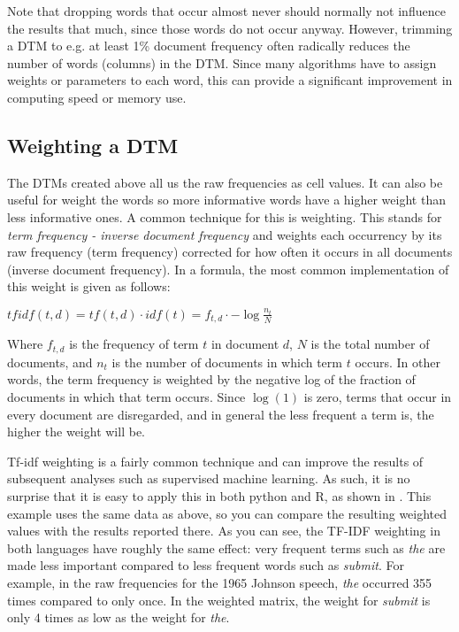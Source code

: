 Note that dropping words that occur almost never should normally not influence the results that much, since those words do not occur anyway.
However, trimming a DTM to e.g. at least 1\% document frequency often radically reduces the number of words (columns) in the DTM.
Since many algorithms have to assign weights or parameters to each word, this can provide a significant improvement in computing speed or memory use. 

\subsection{Weighting a DTM}

The DTMs created above all us the raw frequencies as cell values.
It can also be useful for weight the words so more informative words have a higher weight than less informative ones.
A common technique for this is  weighting.
This stands for \emph{term frequency - inverse document frequency} and weights each occurrency by its raw frequency (term frequency) corrected for how often it occurs in all documents (inverse document frequency). In a formula, the most common implementation of this weight is given as follows:

$tfidf(t,d)=tf(t,d)\cdot idf(t)=f_{t,d}\cdot -\log \frac{n_t}{N}$

Where $f_{t,d}$ is the frequency of term $t$ in document $d$, $N$ is the total number of documents, and $n_t$ is the number of documents in which term $t$ occurs. In other words, the term frequency is weighted by the negative log of the fraction of documents in which that term occurs. Since $\log(1)$ is zero, terms that occur in every document are disregarded, and in general the less frequent a term is, the higher the weight will be. 

Tf-idf weighting is a fairly common technique and can improve the results of subsequent analyses such as supervised machine learning.
As such, it is no surprise that it is easy to apply this in both python and R, as shown in .
This example uses the same data as  above, so you can compare the resulting weighted values with the results reported there.
As you can see, the TF-IDF weighting in both languages have roughly the same effect:
very frequent terms such as \emph{the} are made less important compared to less frequent words such as \emph{submit}.
For example, in the raw frequencies for the 1965 Johnson speech, \emph{the} occurred 355 times compared to  only once.
In the weighted matrix, the weight for \emph{submit} is only 4 times as low as the weight for \emph{the}.

